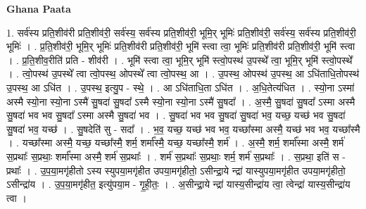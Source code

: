 \documentclass[17pt]{extarticle}
\begin{document}
\textbf{Ghana Paata } \newline

1. सर्व॑स्य प्रति॒शीव॑री प्रति॒शीव॑री॒ सर्व॑स्य॒ सर्व॑स्य प्रति॒शीव॑री॒ भूमि॒र् भूमिः॑ प्रति॒शीव॑री॒ सर्व॑स्य॒ सर्व॑स्य प्रति॒शीव॑री॒ भूमिः॑ । . प्र॒ति॒शीव॑री॒ भूमि॒र् भूमिः॑ प्रति॒शीव॑री प्रति॒शीव॑री॒ भूमि॑ स्त्वा त्वा॒ भूमिः॑ प्रति॒शीव॑री प्रति॒शीव॑री॒ भूमि॑ स्त्वा । . प्र॒ति॒शीव॒रीति॑ प्रति - शीव॑री । . भूमि॑ स्त्वा त्वा॒ भूमि॒र् भूमि॑ स्त्वो॒पस्थ॑ उ॒पस्थे᳚ त्वा॒ भूमि॒र् भूमि॑ स्त्वो॒पस्थे᳚ । . त्वो॒पस्थ॑ उ॒पस्थे᳚ त्वा त्वो॒पस्थ॒ ओपस्थे᳚ त्वा त्वो॒पस्थ॒ आ । . उ॒पस्थ॒ ओपस्थ॑ उ॒पस्थ॒ आ ऽधि॑ताधि॒तोपस्थ॑ उ॒पस्थ॒ आ ऽधि॑त । . उ॒पस्थ॒ इत्यु॒प - स्थे॒ । . आ ऽधि॑ताधि॒ता ऽधि॑त । . अ॒धि॒तेत्य॑धित । . स्यो॒ना ऽस्मा॑ अस्मै स्यो॒ना स्यो॒ना ऽस्मै॑ सु॒षदा॑ सु॒षदा᳚ ऽस्मै स्यो॒ना स्यो॒ना ऽस्मै॑ सु॒षदा᳚ । . अ॒स्मै॒ सु॒षदा॑ सु॒षदा᳚ ऽस्मा अस्मै सु॒षदा॑ भव भव सु॒षदा᳚ ऽस्मा अस्मै सु॒षदा॑ भव । . सु॒षदा॑ भव भव सु॒षदा॑ सु॒षदा॑ भव॒ यच्छ॒ यच्छ॑ भव सु॒षदा॑ सु॒षदा॑ भव॒ यच्छ॑ । . सु॒षदेति॑ सु - सदा᳚ । . भ॒व॒ यच्छ॒ यच्छ॑ भव भव॒ यच्छा᳚स्मा अस्मै॒ यच्छ॑ भव भव॒ यच्छा᳚स्मै । . यच्छा᳚स्मा अस्मै॒ यच्छ॒ यच्छा᳚स्मै॒ शर्म॒ शर्मा᳚स्मै॒ यच्छ॒ यच्छा᳚स्मै॒ शर्म॑ । . अ॒स्मै॒ शर्म॒ शर्मा᳚स्मा अस्मै॒ शर्म॑ स॒प्रथाः᳚ स॒प्रथाः॒ शर्मा᳚स्मा अस्मै॒ शर्म॑ स॒प्रथाः᳚ । . शर्म॑ स॒प्रथाः᳚ स॒प्रथाः॒ शर्म॒ शर्म॑ स॒प्रथाः᳚ । . स॒प्रथा॒ इति॑ स - प्रथाः᳚ । . उ॒प॒या॒मगृ॑हीतो ऽस्य स्युपया॒मगृ॑हीत उपया॒मगृ॑हीतो॒ ऽसीन्द्रा॒ये न्द्रा॑ यास्युपया॒मगृ॑हीत उपया॒मगृ॑हीतो॒ ऽसीन्द्रा॑य । . उ॒प॒या॒मगृ॑हीत॒ इत्यु॑पया॒म - गृ॒ही॒तः॒ । . अ॒सीन्द्रा॒ये न्द्रा॑ यास्य॒सीन्द्रा॑य त्वा॒ त्वेन्द्रा॑ यास्य॒सीन्द्रा॑य त्वा । \newline
\end{document}
